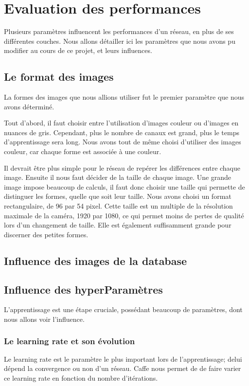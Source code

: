 \documentclass[a4paper,12pt]{article}
\begin{document}
\newpage
\section{Evaluation des performances}
  Plusieurs paramètres influencent les performances d'un réseau, en plus de ses différentes couches. Nous allons détailler ici les paramètres que nous avons pu modifier au cours de ce projet, et leurs influences.
  \subsection{Le format des images}
    La formes des images que nous allions utiliser fut le premier paramètre que nous avons déterminé. 
    
    Tout d'abord, il faut choisir entre l'utilisation d'images couleur ou d'images en nuances de gris. Cependant, plus le nombre de canaux est grand, plus le temps d'apprentissage sera long. Nous avons tout de même choisi d'utiliser des images couleur, car chaque forme est associée à une couleur. 

    Il devrait être plus simple pour le réseau de repérer les différences entre chaque image.
    Ensuite il nous faut décider de la taille de chaque image. Une grande image impose beaucoup de calculs, il faut donc choisir une taille qui permette de distinguer les formes, quelle que soit leur taille. Nous avons choisi un format rectangulaire, de 96 par 54 pixel. Cette taille est un multiple de la résolution maximale de la caméra, 1920 par 1080, ce qui permet moins de pertes de qualité lors d'un changement de taille. Elle est également suffisamment grande pour discerner des petites formes.
    
  \subsection{Influence des images de la database}

  
  \subsection{Influence des hyperParamètres}
    L'apprentissage est une étape cruciale, possédant beaucoup de paramètres, dont nous allons voir l'influence.
    \subsubsection{Le learning rate et son évolution}
      Le learning rate est le paramètre le plus important lors de l'apprentissage; delui dépend la convergence ou non d'un réseau. Caffe nous permet de de faire varier ce learning rate en fonction du nombre d'itérations.
\end{document}
